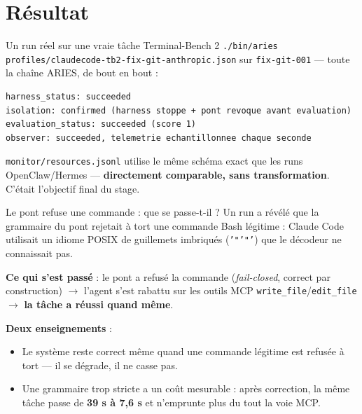 \documentclass[aspectratio=169]{beamer}
\begin{document}
\section{Résultat}

\begin{frame}[fragile]{Un run réel sur une vraie tâche Terminal-Bench 2}
\texttt{./bin/aries profiles/claudecode-tb2-fix-git-anthropic.json} sur
\texttt{fix-git-001} --- toute la chaîne ARIES, de bout en bout :

\vspace{0.3cm}
\begin{lstlisting}
harness_status: succeeded
isolation: confirmed (harness stoppe + pont revoque avant evaluation)
evaluation_status: succeeded (score 1)
observer: succeeded, telemetrie echantillonnee chaque seconde
\end{lstlisting}

\texttt{monitor/resources.jsonl} utilise le même schéma exact que les runs
OpenClaw/Hermes --- \textbf{directement comparable, sans transformation}.
C'était l'objectif final du stage.
\end{frame}

\begin{frame}{Le pont refuse une commande : que se passe-t-il ?}
Un run a révélé que la grammaire du pont rejetait à tort une commande Bash
légitime : Claude Code utilisait un idiome POSIX de guillemets imbriqués
(\texttt{'"'"'}) que le décodeur ne connaissait pas.

\vspace{0.3cm}
\textbf{Ce qui s'est passé} : le pont a refusé la commande (\emph{fail-closed},
correct par construction) $\rightarrow$ l'agent s'est rabattu sur les outils
MCP \texttt{write\_file}/\texttt{edit\_file} $\rightarrow$ \textbf{la tâche a
réussi quand même}.

\vspace{0.3cm}
\textbf{Deux enseignements} :
\begin{itemize}
  \item Le système reste correct même quand une commande légitime est refusée
        à tort --- il se dégrade, il ne casse pas.
  \item Une grammaire trop stricte a un coût mesurable : après correction,
        la même tâche passe de \textbf{39 s à 7,6 s} et n'emprunte plus du
        tout la voie MCP.
\end{itemize}
\end{frame}

\end{document}
